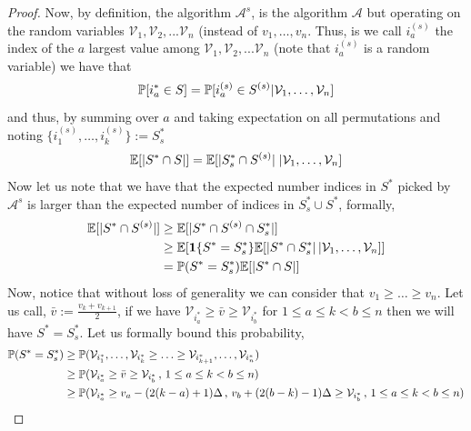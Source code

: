 \begin{proof}
Now, by definition, the algorithm $\mathcal{A}^{s}$, is the algorithm $\mathcal{A}$ but operating on the random variables $\mathcal{V}_1, \mathcal{V}_2, ...\mathcal{V}_n$ (instead of $v_1,\ldots, v_n$. Thus, is we call $i_a^{(s)}$ the index of the $a$ largest value among  $\mathcal{V}_1, \mathcal{V}_2, ...\mathcal{V}_n$ (note that $i_a^{(s)}$ is a random variable) we have that 
\begin{equation}
   {\mathbb{P}}[i_a^* \in S] = {\mathbb{P}}[i_a^{(s)} \in S^{(s)}|\mathcal{V}_1, \dots,\mathcal{V}_n]
\end{equation}
and thus, by summing over $a$ and taking expectation on all permutations and noting $\{i_1^{(s)},\ldots,i_k^{(s)}\} := S^*_s$
\begin{equation}
    {\mathbb{E}}[|S^* \cap S|] = {\mathbb{E}}[|S^*_s \cap S^{(s)}|  \; | \mathcal{V}_1, \ldots,\mathcal{V}_n]
\end{equation}
Now let us note that 
we have that the expected number indices in $S^*$ picked by $\mathcal{A}^{s}$ is larger than the expected number of indices in $S^*_s\cup S^*$, formally,
\begin{align}
    {\mathbb{E}}[|S^* \cap S^{(s)}|]  \notag
    &\geq {\mathbb{E}}[|S^* \cap S^{(s)} \cap S^*_s|] \notag \\
    &\geq {\mathbb{E}} [ \mathbf{1}\{S^* = S^*_s\} {\mathbb{E}}[|S^* \cap S^*_s|\,| \mathcal{V}_1, \ldots,\mathcal{V}_n]] \notag\\
    &= {\mathbb{P}}(S^*=S^*_s) {\mathbb{E}}[|S^* \cap S|]
\end{align}
Now, notice that without loss of generality we can consider that $v_1 \geq \dots \geq v_n$. Let us call, $\bar v:= \frac{v_k + v_{k+1}}{2}$, if we have $\mathcal{V}_{i_a^*} \geq \bar v \geq \mathcal{V}_{i_b^*}$ for $1 \leq a \leq k < b \leq n$ then we will have $S^*=S^*_s$. Let us formally bound this probability,
\begin{align*}
    \sP(S^*=S^*_s) 
    &\geq \sP(\mathcal{V}_{i_1^*}, \ldots, \mathcal{V}_{i_k^*} \geq \ldots \geq \mathcal{V}_{i_{k+1}^*} , \ldots, \mathcal{V}_{i_n^*})  \\
     & \geq \sP(\mathcal{V}_{i_a^*} \geq \bar v \geq \mathcal{V}_{i_b^*}\,,\,1 \leq a \leq k < b \leq n) \\
    & \geq \sP(\mathcal{V}_{i_a^*} \geq v_a - (2(k-a)+1)\Delta\,,\,   v_b + (2(b-k)-1) \Delta \geq  \mathcal{V}_{i_b^*}\,,\,1 \leq a \leq k < b \leq n) \\

\end{align*}
\end{proof}
